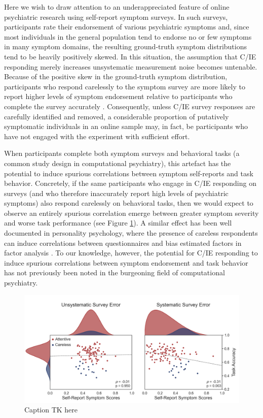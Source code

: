 \documentclass[a4paper,notitlepage,12pt]{article}
\begin{document}
Here we wish to draw attention to an underappreciated feature of online psychiatric research using self-report symptom surveys. In such surveys, participants rate their endorsement of various psychiatric symptoms and, since most individuals in the general population tend to endorse no or few symptoms in many symptom domains, the resulting ground-truth symptom distributions tend to be heavily positively skewed. In this situation, the assumption that C/IE responding merely increases unsystematic measurement noise becomes untenable. Because of the positive skew in the ground-truth symptom distribution, participants who respond carelessly to the symptom survey are more likely to report higher levels of symptom endorsement relative to participants who complete the survey accurately \cite{chandler2020participant, ophir2020turker}. Consequently, unless C/IE survey responses are carefully identified and removed, a considerable proportion of putatively symptomatic individuals in an online sample may, in fact, be participants who have not engaged with the experiment with sufficient effort.

When participants complete both symptom surveys and behavioral tasks (a common study design in computational psychiatry), this artefact has the potential to induce spurious correlations between symptom self-reports and task behavior. Concretely, if the same participants who engage in C/IE responding on surveys (and who therefore inaccurately report high levels of psychiatric symptoms) also respond carelessly on behavioral tasks, then we would expect to observe an entirely spurious correlation emerge between greater symptom severity and worse task performance (see Figure \ref{fig:simulation}). A similar effect has been well documented in personality psychology, where the presence of careless respondents can induce correlations between questionnaires and bias estimated factors in factor analysis \cite{huang2012detecting, robinson2014inaccurate, huang2015insufficient, chandler2020participant, arias2020little}. To our knowledge, however, the potential for C/IE responding to induce spurious correlations between symptom endorsement and task behavior has not previously been noted in the burgeoning field of computational psychiatry.

\begin{figure}[t]
\includegraphics[width=16cm]{../figures/main_01.png}
\centering
\caption{Caption TK here}
\label{fig:simulation}
\end{figure}
\end{document}
